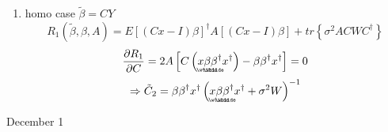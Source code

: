 \documentclass{article}
\begin{document}
\begin{enumerate}
\item homo case $\tilde{\beta}=CY$%
\begin{equation*}
R_{1}\left( \tilde{\beta},\beta ,A\right) =E\left[ \left( Cx-I\right) \beta %
\right] ^{\dagger }A\left[ \left( Cx-I\right) \beta \right] +tr\left\{
\sigma ^{2}ACWC^{\dagger }\right\}
\end{equation*}%
\begin{equation*}
\frac{\partial R_{1}}{\partial C}=2A\left[ C\left( x%
\underaccent{\wtilde}{\beta}%
\underaccent{\wtilde}{\beta}%
^{\dagger }x^{\dagger }\right) -\beta \beta ^{\dagger }x^{\dagger }\right] =0
\end{equation*}%
\begin{equation*}
\Rightarrow \tilde{C}_{2}=\beta \beta ^{\dagger }x^{\dagger }\left( x%
\underaccent{\wtilde}{\beta}%
\underaccent{\wtilde}{\beta}%
^{\dagger }x^{\dagger }+\sigma ^{2}W\right) ^{-1}
\end{equation*}
\end{enumerate}

\bigskip

December 1
\end{document}
